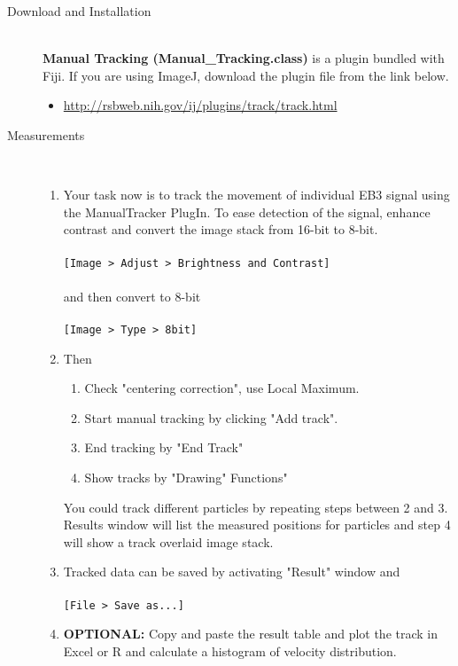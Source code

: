 \documentclass[11pnt]{article}
\begin{document}
\begin{description}
\item[Download and Installation]\hfill\\

\textbf{Manual Tracking (Manual\_Tracking.class)} is a plugin bundled with Fiji. If you are using ImageJ, download the plugin file from the link below. 
\begin{itemize}
\item \url{http://rsbweb.nih.gov/ij/plugins/track/track.html}
\end{itemize}

\item[Measurements]\hfill\\

\begin{enumerate}
\item Your task now is to track the movement of individual EB3 signal using the ManualTracker PlugIn. To ease detection of the signal, enhance contrast and convert the image stack from 16-bit to 8-bit.
\\
\\
\verb"[Image > Adjust > Brightness and Contrast]"
\\
\\
and then convert to 8-bit
\\
\\
\verb"[Image > Type > 8bit]"
\\
\item Then 
\begin{enumerate}
\item Check "centering correction", use Local Maximum.
\item Start manual tracking by clicking "Add track".
\item End tracking by "End Track"
\item Show tracks by "Drawing" Functions"
\end{enumerate}

You could track different particles by repeating steps between 2 and 3. Results window will list the measured positions for particles and step 4 will show a track overlaid image stack.

\item Tracked data can be saved by activating "Result" window and 
\\
\\
\verb"[File > Save as...]"
\\
\item \textbf{OPTIONAL:} Copy and paste the result table and plot the track in Excel or R and calculate a histogram of velocity distribution.
\end{enumerate}

\end{description}
\end{document}

